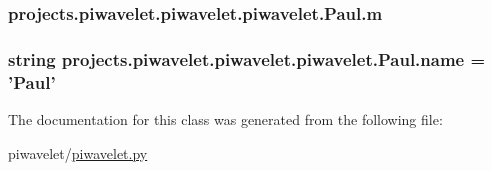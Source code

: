 \hypertarget{classprojects_1_1piwavelet_1_1piwavelet_1_1piwavelet_1_1Paul_aea3aeefe8f36c30c1de347826dc87f20}{
\subsubsection[{m}]{\setlength{\rightskip}{0pt plus 5cm}projects.\-piwavelet.\-piwavelet.\-piwavelet.\-Paul.\-m}}\label{classprojects_1_1piwavelet_1_1piwavelet_1_1piwavelet_1_1Paul_aea3aeefe8f36c30c1de347826dc87f20}
\hypertarget{classprojects_1_1piwavelet_1_1piwavelet_1_1piwavelet_1_1Paul_a60de3ab0c84738469f7002fa61e77bac}{
\subsubsection[{name}]{\setlength{\rightskip}{0pt plus 5cm}string projects.\-piwavelet.\-piwavelet.\-piwavelet.\-Paul.\-name = '{\bf Paul}'\hspace{0.3cm}{\ttfamily [static]}}}\label{classprojects_1_1piwavelet_1_1piwavelet_1_1piwavelet_1_1Paul_a60de3ab0c84738469f7002fa61e77bac}


The documentation for this class was generated from the following file\-:\begin{DoxyCompactItemize}
\item 
piwavelet/\hyperlink{piwavelet_8py}{piwavelet.\-py}\end{DoxyCompactItemize}
